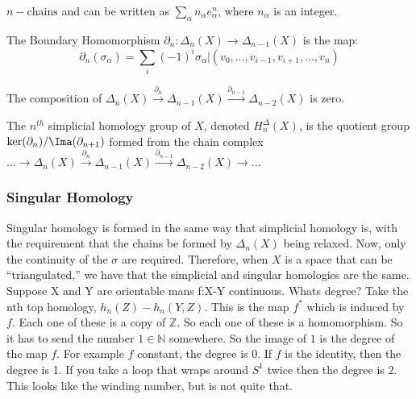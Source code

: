 \documentclass[crop=false,class=article,oneside]{standalone}
\begin{document}
            $n-\textrm{chains}$ and can be written as
            $\sum_{\alpha}n_{\alpha}e_{\alpha}^{n}$, where
            $n_{\alpha}$ is an integer.
            \begin{definition}
                The Boundary Homomorphism
                $\partial_{n}:%
                 \Delta_{n}(X)\rightarrow\Delta_{n-1}(X)$
                is the map:
                \begin{equation*}
                    \partial_{n}(\sigma_{\alpha})=
                    \sum_{i}(-1)^{i}\sigma_{\alpha}|
                    (v_{0},\hdots,v_{i-1},v_{i+1},\hdots,v_{n})
                \end{equation*}
            \end{definition}
            \begin{theorem}
                The composition of
                $\Delta_{n}(X)%
                 \overset{\partial_{n}}{\longrightarrow}%
                 \Delta_{n-1}(X)%
                 \overset{\partial_{n-1}}{\longrightarrow}%
                 \Delta_{n-2}(X)$
                is zero.
            \end{theorem}
            \begin{definition}
                The $n^{th}$ simplicial homology group of
                $X$, denoted $H_{n}^{\Delta}(X)$,
                is the quotient group
                $\ker(\partial_{n})/\Ima(\partial_{n+1})$
                formed from the chain complex
                $\hdots\longrightarrow\Delta_{n}(X)%
                 \overset{\partial_{n}}{\longrightarrow}%
                 \Delta_{n-1}(X)%
                 \overset{\partial_{n-1}}{\longrightarrow}%
                 \Delta_{n-2}(X)\longrightarrow\hdots$
            \end{definition}
        \subsubsection{Singular Homology}
            Singular homology is formed in the same way that
            simplicial homology is, with the requirement
            that the chains be formed by $\Delta_{n}(X)$ being
            relaxed. Now, only the continuity of the $\sigma$
            are required. Therefore, when $X$ is a space that can
            be ``triangulated,'' we have that the simplicial
            and singular homologies are the same.
            Suppose X and Y are orientable mans f:X-Y continuous. Whats degree?
            Take the nth top homology, $h_n(Z)-h_n(Y,Z)$. This is the map
            $f^*$ which is induced by $f$. Each one of these is a copy of
            $\mathbb{Z}$. So each one of these is a homomorphism. So it has
            to send the number $1\in\mathbb{N}$ somewhere. So the image of
            $1$ is the degree of the map $f$. For example
            $f$ constant, the degree is 0. If $f$ is the identity,
            then the degree is 1. If you take a loop that wraps around
            $S^{1}$ twice then the degree is $2$.
            This looks like the winding number, but is not quite that.
\end{document}
